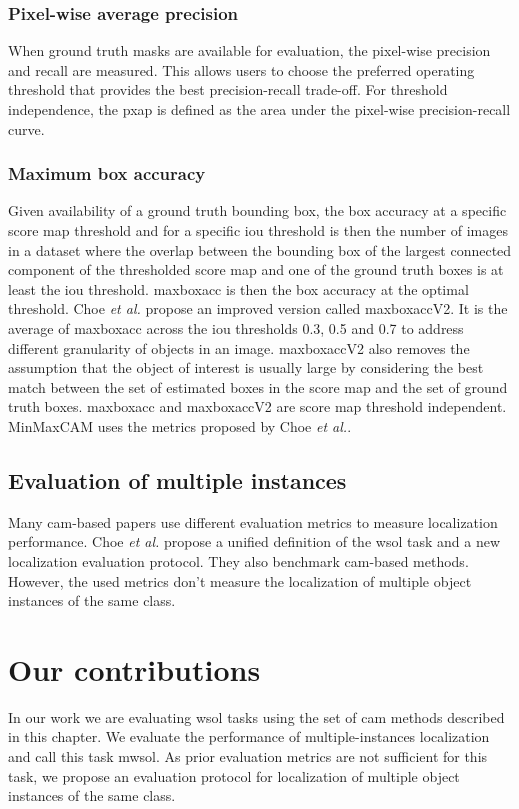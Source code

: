 \subsubsection{Pixel-wise average precision}
When ground truth masks are available for evaluation, the pixel-wise precision and recall \cite{achanta2009frequency} are measured. This allows users to choose the preferred operating threshold that provides the best precision-recall trade-off. For threshold independence, the \acrfull{pxap} is defined as the area under the pixel-wise precision-recall curve.

\subsubsection{Maximum box accuracy}
Given availability of a ground truth bounding box, the box accuracy at a specific score map threshold and for a specific \acrshort{iou} threshold is then the number of images in a dataset where the overlap  between the bounding box of the largest connected component of the thresholded score map and one of the ground truth boxes is at least the \acrshort{iou} threshold. \acrshort{maxboxacc} is then the box accuracy at the optimal threshold. Choe \textit{et al.} propose an improved version called \acrshort{maxboxacc}V2. It is the average of \acrshort{maxboxacc} across the \acrshort{iou} thresholds 0.3, 0.5 and 0.7 to address different granularity of objects in an image. \acrshort{maxboxacc}V2 also removes the assumption that the object of interest is usually large by considering the best match between the set of estimated boxes in the score map and the set of ground truth boxes. \acrshort{maxboxacc} and \acrshort{maxboxacc}V2 are score map threshold independent. MinMaxCAM \cite{wang2021minmaxcam} uses the metrics proposed by Choe \textit{et al.}.

\subsection{Evaluation of multiple instances}
Many \acrshort{cam}-based papers use different evaluation metrics to measure localization performance. Choe \textit{et al.} \cite{choe2020evaluating} propose a unified definition of the \acrshort{wsol} task and a new localization evaluation protocol. They also benchmark \acrshort{cam}-based methods. However, the used metrics don't measure the localization of multiple object instances of the same class.

\section{Our contributions}
In our work we are evaluating \acrshort{wsol} tasks using the set of \acrshort{cam} methods described in this chapter. We evaluate the performance of multiple-instances localization and call this task \acrfull{mwsol}. As prior evaluation metrics are not sufficient for this task, we propose an evaluation protocol for localization of multiple object instances of the same class. 

